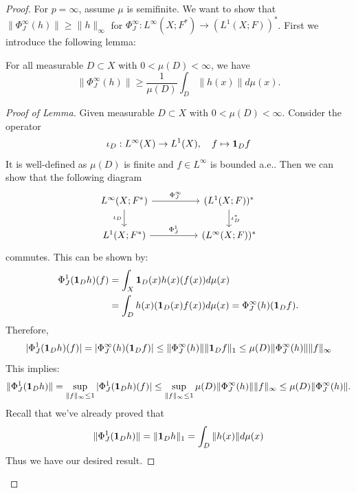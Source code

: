 \begin{proof}
For $p=\infty$, assume $\mu$ is semifinite. We want to show that $\|\Phi_{J}^\infty(h)\|\geq \|h\|_\infty$ for 
$\Phi_{J}^\infty : L^\infty(X;F^*)\rightarrow (L^1(X;F))^*$. First we introduce the following lemma:
\begin{lemma}
For all measurable $D\subset X$ with $0<\mu(D)<\infty$, we have 
\begin{equation*}
    \|\Phi^\infty_J(h)\|\geq \frac{1}{\mu(D)}\int_D \|h(x)\| d\mu(x).
\end{equation*}
\end{lemma}
\begin{proof}[Proof of Lemma]
Given measurable $D\subset X$ with $0<\mu(D)<\infty$. Consider the operator 
\begin{equation*}
    \iota_D : L^\infty(X) \rightarrow L^1(X), \quad f\mapsto \mathbf{1}_D f
\end{equation*}
It is well-defined as $\mu(D)$ is finite and $f\in L^\infty$ is bounded a.e.. Then we can show that the following diagram
\begin{equation*}
\begin{tikzcd}
L^\infty (X;F^*) \arrow[rr, "\Phi_J^\infty"] \arrow[d, "\iota_D"'] &  & (L^1(X;F))^* \arrow[d, "\iota_D^*"] \\
L^1 (X;F^*) \arrow[rr, "\Phi_J^1"]                                 &  & (L^\infty(X;F))^*                  
\end{tikzcd}
\end{equation*}
commutes. This can be shown by:
\begin{align*}
  \Phi_J^1(\mathbf{1}_D h)(f)&=\int_X \mathbf{1}_D(x)h(x)(f(x))d\mu(x)\\
  &=\int_D h(x)(\mathbf{1}_D(x)f(x))d\mu(x)=\Phi^\infty_J(h)(\mathbf{1}_D f).
\end{align*}
Therefore,
\begin{equation*}
    |\Phi_J^1(\mathbf{1}_D h)(f)|=|\Phi^\infty_J(h)(\mathbf{1}_D f)|\leq \|\Phi^\infty_J(h)\|\|\mathbf{1}_D f\|_1\leq \mu(D)\|\Phi^\infty_J(h)\|\| f\|_\infty
\end{equation*}
This implies:
\begin{equation*}
    \|\Phi_J^1(\mathbf{1}_D h)\|=\sup_{\|f\|_\infty \leq 1}|\Phi_J^1(\mathbf{1}_D h)(f)|\leq \sup_{\|f\|_\infty \leq 1}\mu(D)\|\Phi^\infty_J(h)\|\| f\|_\infty\leq \mu(D)\|\Phi^\infty_J(h)\|.
\end{equation*}
Recall that we've already proved that 
\begin{equation*}
    \|\Phi_J^1(\mathbf{1}_D h)\|=\|\mathbf{1}_D h\|_1=\int_D \|h(x)\|d\mu(x)
\end{equation*}
Thus we have our desired result.

\end{proof}
\end{proof}
